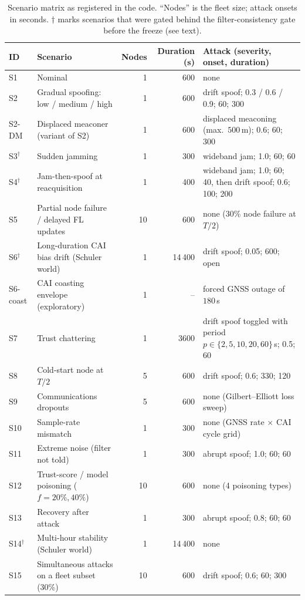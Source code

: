 \documentclass[journal]{IEEEtran}
\begin{document}
\begin{table}[t]
\centering
\caption{Scenario matrix as registered in the code. ``Nodes'' is the fleet size; attack onsets in seconds.
$\dagger$ marks scenarios that were gated behind the filter-consistency gate before the freeze (see text).}
\label{tab:scenarios}
\small
\begin{tabular}{llrrp{6.4cm}}
\toprule
ID & Scenario & Nodes & Duration (s) & Attack (severity, onset, duration) \\
\midrule
S1 & Nominal & 1 & 600 & none \\
S2 & Gradual spoofing: low / medium / high & 1 & 600 & drift spoof; 0.3 / 0.6 / 0.9; 60; 300 \\
S2-DM & Displaced meaconer (variant of S2) & 1 & 600 & displaced meaconing (max.\ $500\,$m); 0.6; 60; 300 \\
S3$^\dagger$ & Sudden jamming & 1 & 300 & wideband jam; 1.0; 60; 60 \\
S4$^\dagger$ & Jam-then-spoof at reacquisition & 1 & 400 & wideband jam; 1.0; 60; 40, then drift spoof; 0.6; 100; 200 \\
S5 & Partial node failure / delayed FL updates & 10 & 600 & none (30\% node failure at $T/2$) \\
S6$^\dagger$ & Long-duration CAI bias drift (Schuler world) & 1 & 14\,400 & drift spoof; 0.05; 600; open \\
S6-coast & CAI coasting envelope (exploratory) & 1 & -- & forced GNSS outage of $180\,$s \\
S7 & Trust chattering & 1 & 3600 & drift spoof toggled with period $p \in \{2,5,10,20,60\}\,$s; 0.5; 60 \\
S8 & Cold-start node at $T/2$ & 5 & 600 & drift spoof; 0.6; 330; 120 \\
S9 & Communications dropouts & 5 & 600 & none (Gilbert--Elliott loss sweep) \\
S10 & Sample-rate mismatch & 1 & 300 & none (GNSS rate $\times$ CAI cycle grid) \\
S11 & Extreme noise (filter not told) & 1 & 300 & abrupt spoof; 1.0; 60; 60 \\
S12 & Trust-score / model poisoning ($f{=}20\%,40\%$) & 10 & 600 & none (4 poisoning types) \\
S13 & Recovery after attack & 1 & 300 & abrupt spoof; 0.8; 60; 60 \\
S14$^\dagger$ & Multi-hour stability (Schuler world) & 1 & 14\,400 & none \\
S15 & Simultaneous attacks on a fleet subset (30\%) & 10 & 600 & drift spoof; 0.6; 60; 300 \\
\bottomrule
\end{tabular}
\end{table}
\end{document}
